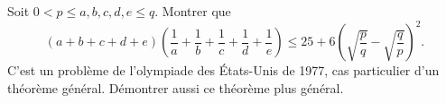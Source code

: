 Soit $0 < p \leq a, b, c, d, e \leq q$. Montrer que
\[ (a + b + c + d + e)\left(\frac{1}{a} + \frac{1}{b} + \frac{1}{c} + \frac{1}{d} + \frac{1}{e}\right) \leq 25 + 6\left(\sqrt{\frac{p}{q}} - \sqrt{\frac{q}{p}}\right)^2. \]
C'est un problème de l'olympiade des États-Unis de 1977, cas particulier d'un théorème général. Démontrer aussi ce théorème plus général.
